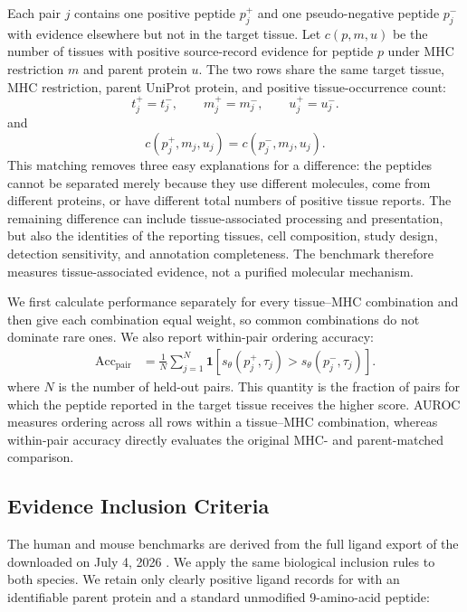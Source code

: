 Each pair \(j\) contains one positive peptide \(p_j^{+}\) and one pseudo-negative peptide \(p_j^{-}\) with evidence elsewhere but not in the target tissue. Let \(c(p,m,u)\) be the number of tissues with positive source-record evidence for peptide \(p\) under MHC restriction \(m\) and parent protein \(u\). The two rows share the same target tissue, MHC restriction, parent UniProt protein, and positive tissue-occurrence count:
\[
t_j^{+}=t_j^{-}, \qquad
m_j^{+}=m_j^{-}, \qquad
u_j^{+}=u_j^{-}.
\]
and
\[
c(p_j^{+},m_j,u_j)=c(p_j^{-},m_j,u_j).
\]
This matching removes three easy explanations for a difference: the peptides cannot be separated merely because they use different \plainMHC{} molecules, come from different proteins, or have different total numbers of positive tissue reports. The remaining difference can include tissue-associated processing and presentation, but also the identities of the reporting tissues, cell composition, study design, detection sensitivity, and annotation completeness. The benchmark therefore measures tissue-associated evidence, not a purified molecular mechanism.

We first calculate performance separately for every tissue--MHC combination and then give each combination equal weight, so common combinations do not dominate rare ones. We also report within-pair ordering accuracy:
\[
\begin{aligned}
    \operatorname{Acc}_{\mathrm{pair}}
&=
\frac{1}{N}\sum_{j=1}^{N}
\mathbf{1}\!\left[
s_{\theta}(p_j^{+},\tau_j)
>
s_{\theta}(p_j^{-},\tau_j)
\right].
\end{aligned}
\]
where \(N\) is the number of held-out pairs. This quantity is the fraction of pairs for which the peptide reported in the target tissue receives the higher score. AUROC measures ordering across all rows within a tissue--MHC combination, whereas within-pair accuracy directly evaluates the original MHC- and parent-matched comparison.

\subsection{Evidence Inclusion Criteria}

The human and mouse benchmarks are derived from the full ligand export of the \plainIEDB{} downloaded on July 4, 2026 \cite{vita2025iedb}. We apply the same biological inclusion rules to both species. We retain only clearly positive ligand records for \plainMHCI{} with an identifiable parent protein and a standard unmodified 9-amino-acid peptide:

